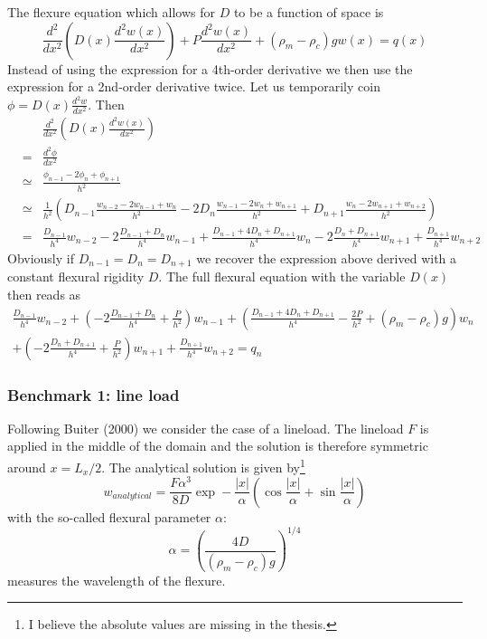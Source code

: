 The flexure equation which allows for $D$ to be a function of space is 
\[
\frac{d^2}{dx^2} \left( D(x) \frac{d^2w(x)}{dx^2} \right) + P \frac{d^2w(x)}{dx^2} + (\rho_m-\rho_c)g w(x) = q(x)
\]
Instead of using the expression for a 4th-order derivative we then use the expression for a 2nd-order derivative twice. 
Let us temporarily coin $\phi=D(x) \frac{d^2w}{dx^2}$.
Then
\begin{eqnarray}
&&\frac{d^2}{dx^2} \left( D(x) \frac{d^2w(x)}{dx^2} \right)\\
&=& \frac{d^2 \phi}{dx^2} \\
&\simeq& \frac{\phi_{n-1}-2\phi_n+\phi_{n+1}}{h^2} \nonumber\\
&\simeq& \frac{1}{h^2}
\left(
D_{n-1} \frac{w_{n-2}-2w_{n-1}+w_{n}}{h^2}
-2 D_n \frac{w_{n-1}-2w_n+w_{n+1}}{h^2}
+ D_{n+1} \frac{w_{n}-2w_{n+1}+w_{n+2}}{h^2}
\right) \nonumber\\
&=&
\frac{D_{n-1}}{h^4} w_{n-2}
-2\frac{D_{n-1}+D_n}{h^4} w_{n-1}
+\frac{D_{n-1}+4D_n+D_{n+1}  }{h^4} w_n
-2\frac{D_{n}+D_{n+1}}{h^4} w_{n+1}
+\frac{D_{n+1}}{h^4} w_{n+2} \nonumber
\end{eqnarray}
Obviously if $D_{n-1}=D_n=D_{n+1}$ we recover the 
expression above derived with a constant flexural 
rigidity $D$.
The full flexural equation with the variable $D(x)$ then reads as
\begin{eqnarray}
\frac{D_{n-1}}{h^4} w_{n-2}
+\left(-2\frac{D_{n-1}+D_{n}}{h^4}+\frac{P}{h^2}\right)w_{n-1}
+\left(\frac{D_{n-1}+4D_{n}+D_{n+1}}{h^4}-\frac{2P}{h^2} +(\rho_m-\rho_c)g \right)w_n \nonumber\\
+\left(-2\frac{D_{n}+D_{n+1}}{h^4}+\frac{P}{h^2}\right)w_{n+1}
+\frac{D_{n+1}}{h^4} w_{n+2} = q_n
\end{eqnarray}




\subsubsection*{Benchmark 1: line load}

Following Buiter (2000) \cite{buiter_thesis} we consider the case of a lineload.
The lineload $F$ is applied in the middle of the domain and the solution 
is therefore symmetric around $x=L_x/2$.
The analytical solution is given by\footnote{I believe the absolute values
are missing in the thesis.} 
\[
w_{analytical} = \frac{F \alpha^3}{8 D} \exp -\frac{|x|}{\alpha}
\left(
\cos \frac{|x|}{\alpha} + \sin \frac{|x|}{\alpha} 
\right)
\]
with the so-called flexural parameter $\alpha$:
\[
\alpha=\left(\frac{4D}{(\rho_m-\rho_c)g}\right)^{1/4}
\]
measures the wavelength of the flexure.

